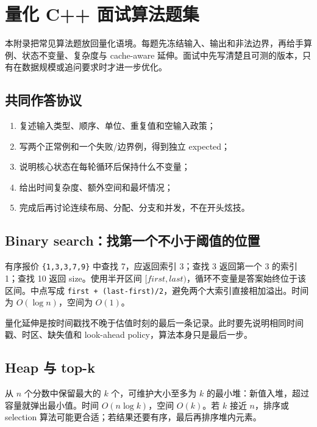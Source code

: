 \chapter{量化 C++ 面试算法题集}

本附录把常见算法题放回量化语境。每题先冻结输入、输出和非法边界，再给手算例、状态不变量、复杂度与 cache-aware 延伸。面试中先写清楚且可测的版本，只有在数据规模或追问要求时才进一步优化。

\section{共同作答协议}

\begin{enumerate}
  \item 复述输入类型、顺序、单位、重复值和空输入政策；
  \item 写两个正常例和一个失败/边界例，得到独立 expected；
  \item 说明核心状态在每轮循环后保持什么不变量；
  \item 给出时间复杂度、额外空间和最坏情况；
  \item 完成后再讨论连续布局、分配、分支和并发，不在开头炫技。
\end{enumerate}

\section{Binary search：找第一个不小于阈值的位置}

有序报价 \texttt{\{1,3,3,7,9\}} 中查找 7，应返回索引 3；查找 3 返回第一个 3 的索引 1；查找 10 返回 size。使用半开区间 \([first,last)\)，循环不变量是答案始终位于该区间。中点写成 \texttt{first + (last-first)/2}，避免两个大索引直接相加溢出。时间为 \(O(\log n)\)，空间为 \(O(1)\)。

量化延伸是按时间戳找不晚于估值时刻的最后一条记录。此时要先说明相同时间戳、时区、缺失值和 look-ahead policy，算法本身只是最后一步。

\section{Heap 与 top-k}

从 \(n\) 个分数中保留最大的 \(k\) 个，可维护大小至多为 \(k\) 的最小堆：新值入堆，超过容量就弹出最小值。时间 \(O(n\log k)\)，空间 \(O(k)\)。若 \(k\) 接近 \(n\)，排序或 selection 算法可能更合适；若结果还要有序，最后再排序堆内元素。

